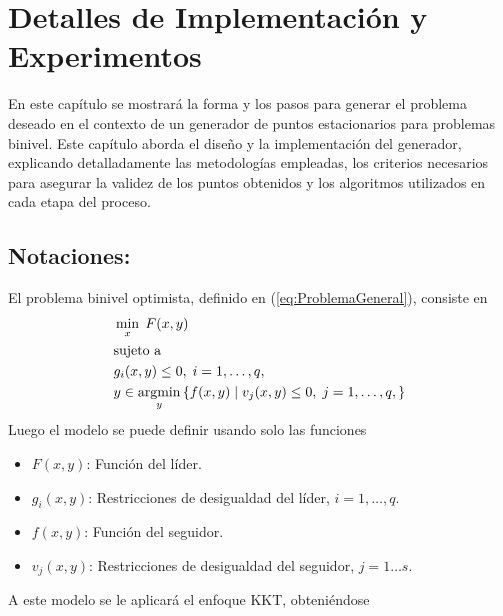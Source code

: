 \chapter{Detalles de Implementación y Experimentos}\label{chapter:implementation}

En este capítulo se mostrará la forma y los pasos para generar el problema deseado en el contexto de un generador de puntos estacionarios para problemas binivel. Este capítulo aborda el diseño y la implementación del generador, explicando detalladamente las metodologías empleadas, los criterios necesarios para asegurar la validez de los puntos obtenidos y los algoritmos utilizados en cada etapa del proceso.

\section{Notaciones:}
 El problema binivel optimista, definido en (\ref{eq:ProblemaGeneral}), consiste en
\begin{equation}
\begin{aligned}
& \min_{x} \; F(x, y) \\
& \text{sujeto a } \\
& g_i(x, y)\leq 0,\;i=1,\ldots,q, \\
& y \in \operatorname*{argmin}_{y} \left\{ f(x, y) \mid v_j(x, y)\leq 0,\;j=1,\ldots,q ,\right\}
\end{aligned}
\end{equation}
Luego el modelo se puede definir usando solo las funciones 
\begin{itemize}
    \item$F(x,y)$: Función del líder.                                                                                                          \\
       \item $ g_i(x,y) $:               Restricciones de desigualdad del líder,  $ i=1,\ldots, q$.       \\
        \item $ f(x,y) $:            Función del seguidor.                                                               \\
       \item $ v_j(x,y) $:                Restricciones de desigualdad del seguidor, $j=1\ldots s$.   \\
    \end{itemize}
A este modelo se le aplicar\'a el enfoque KKT, obteni\'endose
